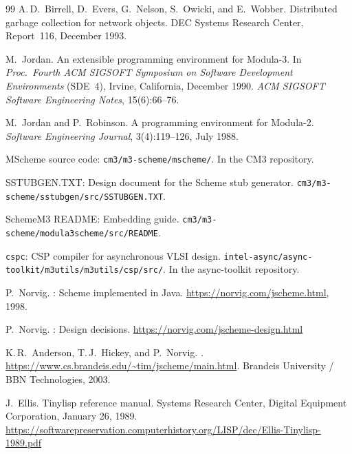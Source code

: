 \documentclass[11pt]{article}
\begin{document}
\begin{thebibliography}{99}
A.\,D.\ Birrell, D.~Evers, G.~Nelson, S.~Owicki, and E.~Wobber.
\newblock Distributed garbage collection for network objects.
\newblock DEC Systems Research Center, Report~116, December 1993.


M.~Jordan.
\newblock An extensible programming environment for {Modula-3}.
\newblock In \emph{Proc.\ Fourth ACM SIGSOFT Symposium on Software
  Development Environments} (SDE~4), Irvine, California, December
  1990.
\newblock \emph{ACM SIGSOFT Software Engineering Notes},
  15(6):66--76.

M.~Jordan and P.~Robinson.
\newblock A programming environment for {Modula-2}.
\newblock \emph{Software Engineering Journal}, 3(4):119--126, July
  1988.


MScheme source code: \texttt{cm3/m3-scheme/mscheme/}.
\newblock In the CM3 repository.

SSTUBGEN.TXT: Design document for the Scheme stub generator.
\newblock \texttt{cm3/m3-scheme/sstubgen/src/SSTUBGEN.TXT}.

SchemeM3 README: Embedding guide.
\newblock \texttt{cm3/m3-scheme/modula3scheme/src/README}.

\texttt{cspc}: CSP compiler for asynchronous VLSI design.
\newblock \texttt{intel-async/async-toolkit/m3utils/m3utils/csp/src/}.
\newblock In the async-toolkit repository.


P.~Norvig.
: {Scheme} implemented in {Java}.
\newblock \url{https://norvig.com/jscheme.html}, 1998.

P.~Norvig.
: Design decisions.
\newblock \url{https://norvig.com/jscheme-design.html}

K.\,R.\ Anderson, T.\,J.\ Hickey, and P.~Norvig.
.
\newblock \url{https://www.cs.brandeis.edu/~tim/jscheme/main.html}.
\newblock Brandeis University / BBN Technologies, 2003.


J.~Ellis.
\newblock Tinylisp reference manual.
\newblock Systems Research Center, Digital Equipment Corporation,
  January 26, 1989.
\newblock \url{https://softwarepreservation.computerhistory.org/LISP/dec/Ellis-Tinylisp-1989.pdf}


\end{thebibliography}
\end{document}
